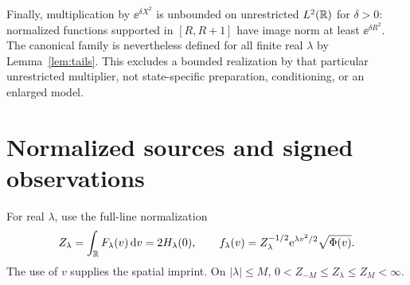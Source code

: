 Finally, multiplication by $\ee^{\delta X^2}$ is unbounded on
unrestricted $L^2(\mathbb R)$ for $\delta>0$: normalized functions supported
in $[R,R+1]$ have image norm at least $\ee^{\delta R^2}$.
The canonical family is nevertheless defined for all finite real
$\lambda$ by Lemma~\ref{lem:tails}. This excludes a bounded realization
by that particular unrestricted multiplier, not state-specific
preparation, conditioning, or an enlarged model.

\section{Normalized sources and signed observations}\label{sec:normalized}

For real $\lambda$, use the full-line normalization
\begin{equation}\label{eq:fstate}
 Z_\lambda=\int_\mathbb R F_\lambda(v)\,\mathrm d v=2H_\lambda(0),\qquad
 f_\lambda(v)=Z_\lambda^{-1/2}\mathrm e^{\lambda v^2/2}\sqrt{\Phi(v)}.
\end{equation}
The use of $v$ supplies the spatial imprint. On $|\lambda|\le M$,
$0<Z_{-M}\le Z_\lambda\le Z_M<\infty$.

